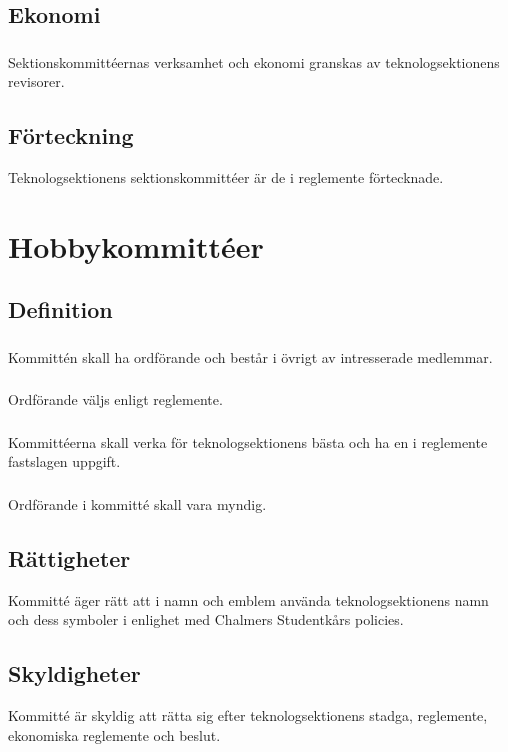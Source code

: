 \documentclass[a4paper]{dtek}
\begin{document}
\subsection{Ekonomi}
\subsubsection{}
Sektionskommittéernas verksamhet och ekonomi granskas av teknologsektionens revisorer.
\subsection{Förteckning}
Teknologsektionens sektionskommittéer är de i reglemente förtecknade.
\newpage

\section{Hobbykommittéer}
\subsection{Definition}
\subsubsection{}
Kommittén skall ha ordförande och består i övrigt av intresserade medlemmar.
\subsubsection{}
Ordförande väljs enligt reglemente.
\subsubsection{}
Kommittéerna skall verka för teknologsektionens bästa och ha en i reglemente fastslagen uppgift.
\subsubsection{}
Ordförande i kommitté skall vara myndig.
\subsection{Rättigheter}
Kommitté äger rätt att i namn och emblem använda teknologsektionens namn och dess symboler i enlighet med Chalmers Studentkårs policies.
\subsection{Skyldigheter}
Kommitté är skyldig att rätta sig efter teknologsektionens stadga, reglemente, ekonomiska reglemente och beslut.
\end{document}
